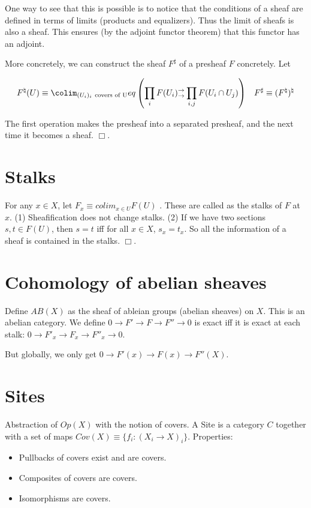 \documentclass[11pt]{book}
\def\qed{$\Box$}
\begin{document}
One way to see that this is possible is to notice that the conditions of a sheaf are defined
in terms of limits (products and equalizers). Thus the limit of sheafs is also a sheaf. This ensures
(by the adjoint functor theorem) that this functor has an adjoint.

More concretely, we can construct the sheaf $F^\sharp$ of a presheaf $F$ concretely. Let 

\begin{align*}
&F^\natural(U) \equiv \colim_{(U_i)_i~\text{covers of U}}  eq \left(\prod_i F(U_i)^\rightarrow_\rightarrow \prod_{i, j} F(U_i \cap U_j) \right)
&F^\sharp \equiv (F^\natural)^\natural
\end{align*}

The first operation makes the presheaf into a separated presheaf, and the next time it becomes a sheaf.
\qed.

\section{Stalks}
For any $x \in X$, let $F_x \equiv colim_{x \in U} F(U)$ . These are called as the stalks of $F$ at $x$.
(1) Sheafification does not change stalks. (2) If we have two sections $s, t \in F(U)$, then $s = t$ iff for all $x \in X$, $s_x = t_x$.
So all the information of a sheaf is contained in the stalks. \qed.


\section{Cohomology of abelian sheaves}


Define $AB(X)$ as the sheaf of ableian groups (abelian sheaves) on $X$. This is an abelian category.
We define $0 \rightarrow F' \rightarrow F \rightarrow F'' \rightarrow 0$ is exact iff it is exact at each stalk:
$0 \rightarrow F'_x \rightarrow F_x \rightarrow F''_x \rightarrow 0$.

But globally, we only get $0 \rightarrow F'(x) \rightarrow F(x) \rightarrow F''(X)$.


\section{Sites}

Abstraction of $Op(X)$ with the notion of covers. A Site is a category $C$ together with a set of
maps $Cov(X) \equiv \{ f_i: (X_i \rightarrow X)_i \}$. Properties:

\begin{itemize}
        \item Pullbacks of covers exist and are covers.
        \item Composites of covers are covers.
        \item Isomorphisms are covers.
\end{itemize}
\end{document}
